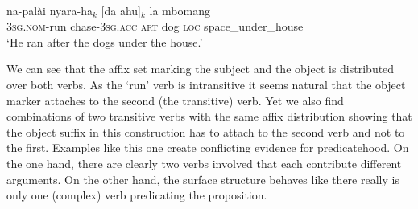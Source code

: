 \ea \label{kambera10}
\\
\gll na-palài nyara-ha$_k$ [da ahu]$_k$ la mbomang \\
\textsc{3}\textsc{sg}.\textsc{nom}-run chase-\textsc{3}\textsc{sg}.\textsc{acc} \textsc{art} dog \textsc{loc} space\_under\_house \\
\glft `He ran after the dogs under the house.' \\ 
\z

We can see that the affix set marking the subject and the object is distributed over both verbs. As the `run' verb is intransitive it seems natural that the object marker attaches to the second (the transitive) verb. Yet we also find combinations of two transitive verbs with the same affix distribution showing that the object suffix in this construction has to attach to the second verb and not to the first. Examples like this one create conflicting evidence for predicatehood. On the one hand, there are clearly two verbs involved that each contribute different arguments. On the other hand, the surface structure behaves like there really is only one (complex) verb predicating the proposition.

